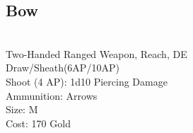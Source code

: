 \subsection{Bow}\label{weapon:bow}\\
Two-Handed Ranged Weapon,  Reach, DE\\
Draw/Sheath(6AP/10AP)\\
Shoot (4 AP): 1d10 Piercing Damage\\
Ammunition: Arrows\\
Size: M\\
Cost: 170 Gold\\